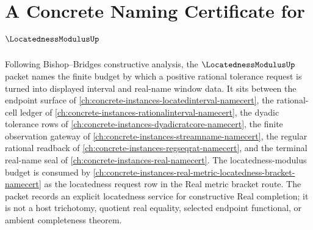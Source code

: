 \chapter{A Concrete Naming Certificate for $\LocatednessModulusUp$}
\label{ch:concrete-instances-locatedness-modulus-namecert}

Following Bishop--Bridges constructive analysis, the $\LocatednessModulusUp$ packet names the finite budget by which a positive rational tolerance request is turned into displayed interval and real-name window data. It sits between the endpoint surface of \autoref{ch:concrete-instances-locatedinterval-namecert}, the rational-cell ledger of \autoref{ch:concrete-instances-rationalinterval-namecert}, the dyadic tolerance rows of \autoref{ch:concrete-instances-dyadicratcore-namecert}, the finite observation gateway of \autoref{ch:concrete-instances-streamname-namecert}, the regular rational readback of \autoref{ch:concrete-instances-regseqrat-namecert}, and the terminal real-name seal of \autoref{ch:concrete-instances-real-namecert}. The locatedness-modulus budget is consumed by \autoref{ch:concrete-instances-real-metric-locatedness-bracket-namecert} as the locatedness request row in the Real metric bracket route. The packet records an explicit locatedness service for constructive Real completion; it is not a host trichotomy, quotient real equality, selected endpoint functional, or ambient completeness theorem.

